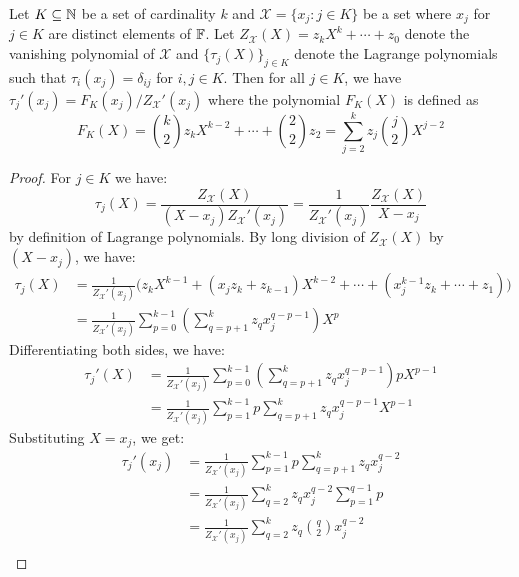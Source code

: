 \begin{lemma}\label{lem:tau}
Let $K\subseteq \mathbb{N}$ be a set of cardinality $k$ and $\mathcal{X}=\{x_j:j\in K\}$ be a set
where $x_j$ for $j\in K$ are distinct elements of $\mathbb{F}$. Let $Z_\mathcal{X}(X)=z_k X^k+\cdots+z_0$ denote the vanishing polynomial of $\mathcal{X}$
and $\{\tau_j(X)\}_{j\in K}$ denote the Lagrange polynomials such that $\tau_i(x_j)=\delta_{ij}$ for $i,j\in K$. Then for all $j\in K$,
we have $\tau_j'(x_j)=F_K(x_j)/Z_\mathcal{X}'(x_j)$ where the polynomial
$F_K(X)$ is defined as
\[F_K(X)=\binom{k}{2}z_k X^{k-2}+\cdots+\binom{2}{2}z_2=\sum_{j=2}^k z_j\binom{j}{2}X^{j-2} \]
\end{lemma}
\begin{proof}
    For $j\in K$ we have: 
    \[\tau_j(X)=\frac{Z_\mathcal{X}(X)}{(X-x_j)Z_\mathcal{X}'(x_j)}= \frac{1}{Z_\mathcal{X}'(x_j)}\frac{Z_\mathcal{X}(X)}{X-x_j}\] 
    by definition of Lagrange polynomials. By long division of $Z_\mathcal{X}(X)$ by $(X-x_j)$, we have:
    \begin{align*}
        \tau_j(X) &= \frac{1}{Z_\mathcal{X}'(x_j)}\big(z_k X^{k-1} + (x_jz_k + z_{k-1})X^{k-2} + \cdots
         + (x_j^{k-1}z_k + \cdots + z_1)\big)\\
        &= \frac{1}{Z_\mathcal{X}'(x_j)}\sum_{p=0}^{k-1} \left(\sum_{q=p+1}^k z_q x_j^{q-p-1}\right)X^p
    \end{align*}
    Differentiating both sides, we have:
    \begin{align*}
    \tau_j'(X) &= \frac{1}{Z_\mathcal{X}'(x_j)}\sum_{p=0}^{k-1} \left(\sum_{q=p+1}^{k}z_q x_j^{q-p-1}\right)p X^{p-1}\\
    &= \frac{1}{Z_\mathcal{X}'(x_j)}\sum_{p=1}^{k-1} p  \sum_{q=p+1}^{k}z_q x_j^{q-p-1} X^{p-1}
    \end{align*}
    Substituting $X=x_j$, we get:
    \begin{align*}
    \tau_j'(x_j) &= \frac{1}{Z_\mathcal{X}'(x_j)} \sum_{p=1}^{k-1} p \sum_{q=p+1}^k z_q x_j^{q-2}\\
    &= \frac{1}{Z_\mathcal{X}'(x_j)}\sum_{q=2}^k z_q x_j^{q-2} \sum_{p=1}^{q-1} p\\
%    
    &= \frac{1}{Z_\mathcal{X}'(x_j)}\sum_{q=2}^k z_q \binom{q}{2} x_j^{q-2}\\

\end{align*}
\end{proof}
